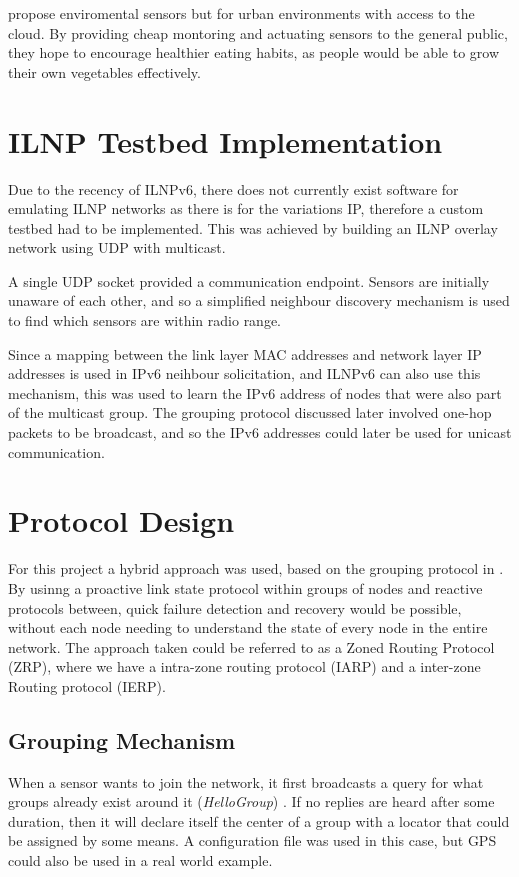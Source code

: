 \documentclass[12pt]{article}
\begin{document}
\cite{indoor} propose enviromental sensors but for urban environments with access to the cloud. By providing cheap montoring and actuating sensors to the general public, they hope to encourage healthier eating habits, as people would be able to grow their own vegetables effectively. 


\section{ILNP Testbed Implementation}

Due to the recency of ILNPv6, there does not currently exist software for emulating ILNP networks as there is for the variations IP, therefore a custom testbed had to be implemented. This was achieved by building an ILNP overlay network using UDP with multicast. 

A single UDP socket provided a communication endpoint. Sensors are initially unaware of each other, and so a simplified neighbour discovery mechanism is used to find which sensors are within radio range. 

Since a mapping between the link layer MAC addresses and network layer IP addresses is used in IPv6 neihbour solicitation, and ILNPv6 can also use this mechanism, this was used to learn the IPv6 address of nodes that were also part of the multicast group. The grouping protocol discussed later involved one-hop packets to be broadcast, and so the IPv6 addresses could later be used for unicast communication. 

\section{Protocol Design}

For this project a hybrid approach was used, based on the grouping protocol in \cite{groups}. By usinng a proactive link state protocol within groups of nodes and reactive protocols between, quick failure detection and recovery would be possible, without each node needing to understand the state of every node in the entire network. The approach taken could be referred to as a Zoned Routing Protocol (ZRP), where we have a intra-zone routing protocol (IARP) and a inter-zone Routing protocol (IERP).

\subsection{Grouping Mechanism}

When a sensor wants to join the network, it first broadcasts a query for what groups already exist around it (\emph{HelloGroup}) . If no replies are heard after some duration, then it will declare itself the center of a group with a locator that could be assigned by some means. A configuration file was used in this case, but GPS could also be used in a real world example. 
\end{document}
